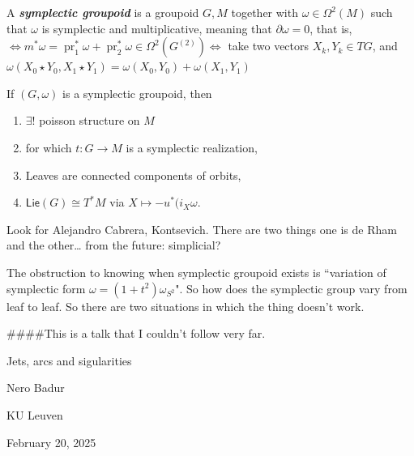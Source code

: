 \begin{defn}\leavevmode
A \textit{\textbf{symplectic groupoid}} is a groupoid \(G, M\) together with  \(\omega \in \Omega^2(M)\) such that \(\omega\) is symplectic and multiplicative, meaning that \(\partial  \omega =0\), that is, \(\iff m^*\omega=\operatorname{pr}_1^*\omega+\operatorname{pr}^*_2\omega\in \Omega^{2}(G^{(2)})\iff\) take two vectors \( X_k,Y_k \in TG\), and \(\omega(X_0 \star Y_0,X_1\star Y_1) =  \omega(X_0,Y_0) + \omega (X_1,Y_1)\)
\end{defn}

\begin{thm}\leavevmode
If \((G, \omega)\) is a symplectic groupoid, then
\begin{enumerate}
\item \(\exists !\) poisson structure on \(M\) 
\item for which \(t: G \to M\) is a symplectic realization,
\item  Leaves are connected components of orbits,
\item \(\mathsf{Lie}(G)\cong T^*M\) via \(X \mapsto -u ^*(i_X \omega\).
\end{enumerate}
\end{thm}

\begin{remark}\leavevmode
Look for Alejandro Cabrera, Kontsevich. There are two things one is de Rham and the other… {\color{8}from the future: simplicial?}
\end{remark}

\begin{upshot}\leavevmode
The obstruction to knowing when symplectic groupoid exists is ``variation of symplectic form \(\omega=(1+t^2) \omega_{S^2}\)". So how does the symplectic group vary from leaf to leaf. So there are two situations in which the thing doesn't work.
\end{upshot}

\iffalse
####This is a talk that I couldn't follow very far.

{\Huge Jets, arcs and sigularities}

\hfill{\Large Nero Badur}

{\Large \hfill KU Leuven}

\hfill{\large February 20, 2025}


